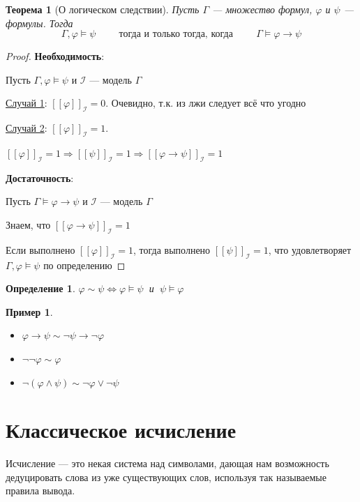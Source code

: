 \documentclass[12pt]{article}
\newtheorem{theorem}{Теорема}
\newtheorem{definition}{Определение}
\newtheorem{example}{Пример}
\begin{document}
\begin{theorem}[О логическом следствии]
	Пусть $\Gamma$ --- множество формул, $\varphi$ и $\psi$ --- формулы. Тогда
	\[ \Gamma, \varphi \models \psi \hspace{1cm} \text{тогда и только тогда, когда} \hspace{1cm} \Gamma \models \varphi \to \psi\]
\end{theorem}
\begin{proof}
	\textbf{Необходимость}:

	Пусть $\Gamma, \varphi \models \psi$ и $\mathcal{I}$ --- модель $\Gamma$

	\underline{Случай 1}: $[\![ \varphi ]\!]_{\mathcal{I}} = 0$.
	Очевидно, т.к. из лжи следует всё что угодно

	\underline{Случай 2}: $[\![ \varphi ]\!]_{\mathcal{I}} = 1$.

	$[\![ \varphi ]\!]_{\mathcal{I}} = 1 \Rightarrow [\![ \psi ]\!]_{\mathcal{I}} = 1 \Rightarrow [\![ \varphi \to \psi ]\!]_{\mathcal{I}} = 1$

	\textbf{Достаточность}:

	Пусть $\Gamma \models \varphi \to \psi$ и $\mathcal{I}$ --- модель $\Gamma$

	Знаем, что $[\![ \varphi \to \psi ]\!]_{\mathcal{I}} = 1$

	Если выполнено $[\![ \varphi ]\!]_{\mathcal{I}} = 1$, тогда выполнено $[\![ \psi ]\!]_{\mathcal{I}} = 1$, что удовлетворяет $\Gamma, \varphi \models \psi$ по определению

\end{proof}

\begin{definition}
	$\varphi \sim \psi \iff \varphi \models \psi \ $ и $\ \psi \models \varphi$
\end{definition}
\begin{example}
	\leavevmode
	\begin{itemize}
		\item $\varphi \to \psi \sim \lnot \psi \to \lnot \varphi$
		\item $\lnot \lnot \varphi \sim \varphi$
		\item $\lnot (\varphi \land \psi) \sim \lnot \varphi \lor \lnot \psi$
	\end{itemize}
\end{example}

\section{Классическое исчисление}
Исчисление --- это некая система над символами, дающая нам возможность дедуцировать слова из уже существующих слов, используя так называемые правила вывода.
\end{document}
